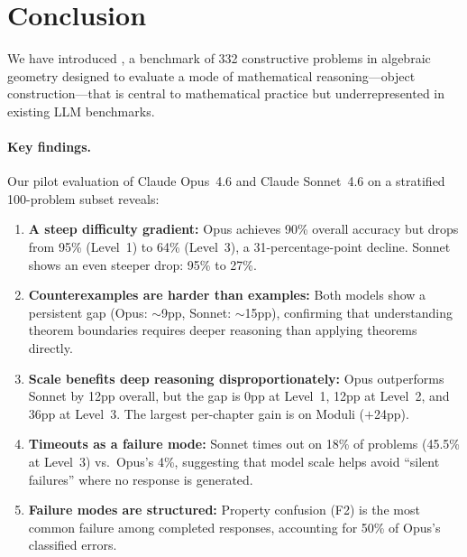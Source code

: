 \section{Conclusion}
\label{sec:conclusion}

We have introduced \ecagbench{}, a benchmark of 332 constructive problems in algebraic geometry designed to evaluate a mode of mathematical reasoning---object construction---that is central to mathematical practice but underrepresented in existing LLM benchmarks.

\paragraph{Key findings.}
Our pilot evaluation of Claude Opus~4.6 and Claude Sonnet~4.6 on a stratified 100-problem subset reveals:
\begin{enumerate}[nosep]
  \item \textbf{A steep difficulty gradient:} Opus achieves 90\% overall accuracy but drops from 95\% (Level~1) to 64\% (Level~3), a 31-percentage-point decline. Sonnet shows an even steeper drop: 95\% to 27\%.
  \item \textbf{Counterexamples are harder than examples:} Both models show a persistent gap (Opus: ${\sim}$9pp, Sonnet: ${\sim}$15pp), confirming that understanding theorem boundaries requires deeper reasoning than applying theorems directly.
  \item \textbf{Scale benefits deep reasoning disproportionately:} Opus outperforms Sonnet by 12pp overall, but the gap is 0pp at Level~1, 12pp at Level~2, and 36pp at Level~3. The largest per-chapter gain is on Moduli ($+$24pp).
  \item \textbf{Timeouts as a failure mode:} Sonnet times out on 18\% of problems (45.5\% at Level~3) vs.\ Opus's 4\%, suggesting that model scale helps avoid ``silent failures'' where no response is generated.
  \item \textbf{Failure modes are structured:} Property confusion (F2) is the most common failure among completed responses, accounting for 50\% of Opus's classified errors.
\end{enumerate}


